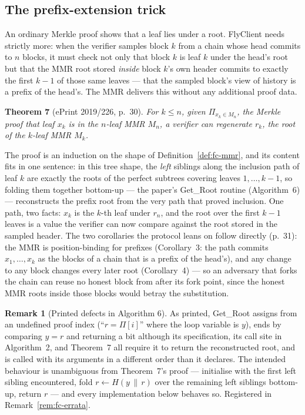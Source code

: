 \documentclass[11pt,a4paper]{article}
\theoremstyle{definition}
\newtheorem{remark}[theorem]{Remark}
\begin{document}
\subsection{The prefix-extension trick}\label{sec:fc-prefix}

An ordinary Merkle proof shows that a leaf lies under a root. FlyClient
needs strictly more: when the verifier samples block $k$ from a chain whose
head commits to $n$ blocks, it must check not only that block $k$ is leaf
$k$ under the head's root but that the MMR root stored \emph{inside} block
$k$'s own header commits to exactly the first $k-1$ of those same leaves
--- that the sampled block's view of history is a prefix of the head's.
The MMR delivers this without any additional proof data.

\medskip
\noindent\textbf{Theorem 7} (ePrint 2019/226, p.~30). \emph{For $k \le n$,
given $\Pi_{x_k \in M_n}$, the Merkle proof that leaf $x_k$ is in the
$n$-leaf MMR $M_n$, a verifier can regenerate $r_k$, the root of the
$k$-leaf MMR $M_k$.}
\medskip

The proof is an induction on the shape of Definition~\ref{def:fc-mmr}, and
its content fits in one sentence: in this tree shape, the \emph{left}
siblings along the inclusion path of leaf $k$ are exactly the roots of the
perfect subtrees covering leaves $1, \dots, k-1$, so folding them together
bottom-up --- the paper's \textsf{Get\_Root} routine (Algorithm~6) ---
reconstructs the prefix root from the very path that proved inclusion. One
path, two facts: $x_k$ is the $k$-th leaf under $r_n$, and the root over
the first $k-1$ leaves is a value the verifier can now compare against the
root stored in the sampled header. The two corollaries the protocol leans
on follow directly (p.~31): the MMR is position-binding for prefixes
(Corollary~3: the path commits $x_1, \dots, x_k$ as the blocks of a chain
that is a prefix of the head's), and any change to any block changes every
later root (Corollary~4) --- so an adversary that forks the chain can reuse
no honest block from after its fork point, since the honest MMR roots
inside those blocks would betray the substitution.

\begin{remark}[Printed defects in Algorithm 6]\label{rem:fc-get-root}
As printed, \textsf{Get\_Root} assigns from an undefined proof index
(``$r = \Pi[i]$'' where the loop variable is $y$), ends by comparing
$y = r$ and returning a bit although its specification, its call site in
Algorithm~2, and Theorem~7 all require it to return the reconstructed root,
and is called with its arguments in a different order than it declares.
The intended behaviour is unambiguous from Theorem~7's proof --- initialise
with the first left sibling encountered, fold $r \leftarrow H(y \,\|\, r)$
over the remaining left siblings bottom-up, return $r$ --- and every
implementation below behaves so. Registered in
Remark~\ref{rem:fc-errata}.
\end{remark}
\end{document}
